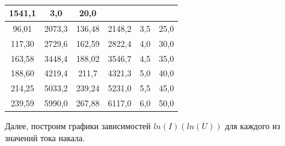 \documentclass[a4paper,12pt]{article}
\begin{document}
\begin{table}[H]
\begin{tabular}{|cc|cc|cc|}
          {\color[HTML]{000000} 1541,1} &
          \multicolumn{1}{c|}{{\color[HTML]{000000} 3,0}} &
          {\color[HTML]{000000} 20,0} \\ \hline
        \multicolumn{1}{|c|}{{\color[HTML]{000000} 96,01}} &
          {\color[HTML]{000000} 2073,3} &
          \multicolumn{1}{c|}{{\color[HTML]{000000} 136,48}} &
          {\color[HTML]{000000} 2148,2} &
          \multicolumn{1}{c|}{{\color[HTML]{000000} 3,5}} &
          {\color[HTML]{000000} 25,0} \\ \hline
        \multicolumn{1}{|c|}{{\color[HTML]{000000} 117,30}} &
          {\color[HTML]{000000} 2729,6} &
          \multicolumn{1}{c|}{{\color[HTML]{000000} 162,59}} &
          {\color[HTML]{000000} 2822,4} &
          \multicolumn{1}{c|}{{\color[HTML]{000000} 4,0}} &
          {\color[HTML]{000000} 30,0} \\ \hline
        \multicolumn{1}{|c|}{{\color[HTML]{000000} 163,58}} &
          {\color[HTML]{000000} 3448,4} &
          \multicolumn{1}{c|}{{\color[HTML]{000000} 188,02}} &
          {\color[HTML]{000000} 3546,7} &
          \multicolumn{1}{c|}{{\color[HTML]{000000} 4,5}} &
          {\color[HTML]{000000} 35,0} \\ \hline
        \multicolumn{1}{|c|}{{\color[HTML]{000000} 188,60}} &
          {\color[HTML]{000000} 4219,4} &
          \multicolumn{1}{c|}{{\color[HTML]{000000} 211,7}} &
          {\color[HTML]{000000} 4321,3} &
          \multicolumn{1}{c|}{{\color[HTML]{000000} 5,0}} &
          {\color[HTML]{000000} 40,0} \\ \hline
        \multicolumn{1}{|c|}{{\color[HTML]{000000} 214,25}} &
          {\color[HTML]{000000} 5033,2} &
          \multicolumn{1}{c|}{{\color[HTML]{000000} 239,24}} &
          {\color[HTML]{000000} 5231,0} &
          \multicolumn{1}{c|}{{\color[HTML]{000000} 5,5}} &
          {\color[HTML]{000000} 45,0} \\ \hline
        \multicolumn{1}{|c|}{{\color[HTML]{000000} 239,59}} &
          {\color[HTML]{000000} 5990,0} &
          \multicolumn{1}{c|}{{\color[HTML]{000000} 267,88}} &
          {\color[HTML]{000000} 6117,0} &
          \multicolumn{1}{c|}{{\color[HTML]{000000} 6,0}} &
          {\color[HTML]{000000} 50,0} \\ \hline
    \end{tabular}
    \caption{}
\end{table}

Далее, построим графики зависимостей $ln(I)(ln(U))$ для каждого из значений тока накала.
\end{document}
